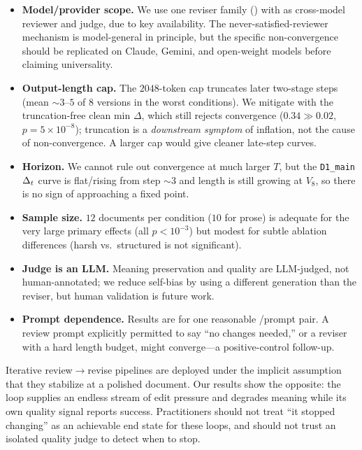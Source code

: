 \begin{itemize}[leftmargin=*,itemsep=1pt,topsep=1pt]
    \item \textbf{Model/provider scope.} We use one reviser family (\gptone) with \gpto as
    cross-model reviewer and judge, due to key availability. The never-satisfied-reviewer
    mechanism is model-general in principle, but the specific non-convergence should be
    replicated on Claude, Gemini, and open-weight models before claiming universality.
    \item \textbf{Output-length cap.} The $2048$-token cap truncates later two-stage steps
    (mean $\sim 3$--$5$ of $8$ versions in the worst conditions). We mitigate with the
    truncation-free clean min $\Delta$, which still rejects convergence ($0.34\gg 0.02$,
    $p=5\times10^{-8}$); truncation is a \emph{downstream symptom} of inflation, not the cause
    of non-convergence. A larger cap would give cleaner late-step curves.
    \item \textbf{Horizon.} We cannot rule out convergence at much larger $T$, but the
    \texttt{D1\_main} $\Delta_t$ curve is flat/rising from step $\sim 3$ and length is still growing
    at $V_8$, so there is no sign of approaching a fixed point.
    \item \textbf{Sample size.} $12$ documents per condition ($10$ for prose) is adequate for
    the very large primary effects (all $p<10^{-3}$) but modest for subtle ablation
    differences (harsh vs.\ structured is not significant).
    \item \textbf{Judge is an LLM.} Meaning preservation and quality are LLM-judged, not
    human-annotated; we reduce self-bias by using a different generation than the reviser, but
    human validation is future work.
    \item \textbf{Prompt dependence.} Results are for one reasonable \Review/\Revise prompt
    pair. A review prompt explicitly permitted to say ``no changes needed,'' or a reviser with
    a hard length budget, might converge---a positive-control follow-up.
\end{itemize}

 Iterative review$\to$revise pipelines are deployed under the
implicit assumption that they stabilize at a polished document. Our results show the opposite:
the loop supplies an endless stream of edit pressure and degrades meaning while its own quality
signal reports success. Practitioners should not treat ``it stopped changing'' as an
achievable end state for these loops, and should not trust an isolated quality judge to detect
when to stop.
